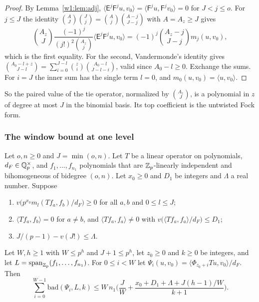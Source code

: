 \begin{proof}
By Lemma~\ref{w1:lem:adj}, $\langle\mathsf E^j\mathsf F^ju,v_0\rangle=\langle\mathsf F^ju,\mathsf F^jv_0\rangle=0$ for $J<j\le o$. For $j\le J$ the identity $\binom{A}J\binom Jj=\binom Aj\binom{A-j}{J-j}$ with $A=A_z\ge J$ gives
\[
\binom{A_z}J\frac{(-1)^j}{(j!)^2\binom{A_z}j}\langle\mathsf E^j\mathsf F^ju,v_0\rangle=(-1)^j\binom{A_z-j}{J-j}m_j(u,v_0),
\]
which is the first equality. For the second, Vandermonde's identity gives $\binom{A_0-l+z}{J-l}=\sum_{i=0}^{J-l}\binom zi\binom{A_0-l}{J-l-i}$, valid since $A_0-l\ge0$. Exchange the sums. For $i=J$ the inner sum has the single term $l=0$, and $m_0(u,v_0)=\langle u,v_0\rangle$.
\end{proof}

So the paired value of the tie operator, normalized by $\binom{A_z}J$, is a polynomial in $z$ of degree at most $J$ in the binomial basis. Its top coefficient is the untwisted Fock form.

\subsubsection{The window bound at one level}

\begin{theorem}\label{w1:thm:level}
Let $o,n\ge0$ and $J=\min(o,n)$. Let $T$ be a linear operator on polynomials, $d_F\in\mathbb Q_p^\times$, and $f_1,\dots,f_{n_1}$ polynomials that are $\mathbb Z_p$-linearly independent and bihomogeneous of bidegree $(o,n)$. Let $x_0\ge0$ and $D_1$ be integers and $\Lambda$ a real number. Suppose
\begin{enumerate}[label=\textup{(\roman*)}]
\item $v\big(p^{x_0}m_l(Tf_a,f_b)/d_F\big)\ge0$ for all $a,b$ and $0\le l\le J$;
\item $\langle Tf_a,f_b\rangle=0$ for $a\ne b$, and $\langle Tf_a,f_a\rangle\ne0$ with $v\big(\langle Tf_a,f_a\rangle/d_F\big)\le D_1$;
\item $J/(p-1)-v(J!)\le\Lambda$.
\end{enumerate}
Let $W,h\ge1$ with $W\le p^h$ and $J+1\le p^h$, let $z_0\ge0$ and $k\ge0$ be integers, and let $L=\operatorname{span}_{\mathbb Z_p}(f_1,\dots,f_{n_1})$. For $0\le i<W$ let $\Psi_i(u,v_0)=\langle\Phi_{z_0+i}Tu,v_0\rangle/d_F$. Then
\[
\sum_{i=0}^{W-1}\mathrm{bad}(\Psi_i,L,k)\le W\,n_1\Big(\frac JW+\frac{x_0+D_1+\Lambda+J(h-1)/W}{k+1}\Big).
\]
\end{theorem}


